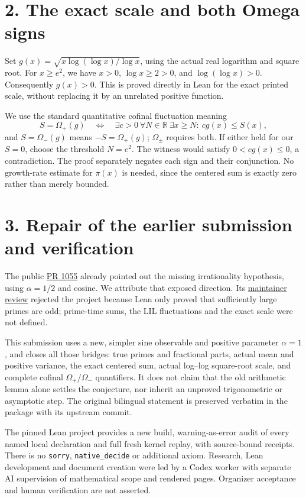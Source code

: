\documentclass[10pt]{article}
\begin{document}
\newpage
\section*{2. The exact scale and both Omega signs}
Set $g(x)=\sqrt{x\log(\log x)/\log x}$, using the actual real logarithm and square root. For $x\ge e^2$, we have $x>0$, $\log x\ge2>0$, and $\log(\log x)>0$. Consequently $g(x)>0$. This is proved directly in Lean for the exact printed scale, without replacing it by an unrelated positive function.

We use the standard quantitative cofinal fluctuation meaning
\[
 S=\Omega_+(g)\quad\Longleftrightarrow\quad
 \exists c>0\ \forall N\in\mathbb R\ \exists x\ge N:\ c g(x)\le S(x),
\]
and $S=\Omega_-(g)$ means $-S=\Omega_+(g)$; $\Omega_{\pm}$ requires both. If either held for our $S=0$, choose the threshold $N=e^2$. The witness would satisfy $0<c g(x)\le0$, a contradiction. The proof separately negates each sign and their conjunction. No growth-rate estimate for $\pi(x)$ is needed, since the centered sum is exactly zero rather than merely bounded.

\section*{3. Repair of the earlier submission and verification}
The public \href{https://github.com/The-Last-Math-Competition/The-Last-Math-Competition/pull/1055}{PR 1055} already pointed out the missing irrationality hypothesis, using $\alpha=1/2$ and cosine. We attribute that exposed direction. Its \href{https://github.com/The-Last-Math-Competition/The-Last-Math-Competition/pull/1055#issuecomment-6270091958}{maintainer review} rejected the project because Lean only proved that sufficiently large primes are odd; prime-time sums, the LIL fluctuations and the exact scale were not defined.

This submission uses a new, simpler sine observable and positive parameter $\alpha=1$, and closes all those bridges: true primes and fractional parts, actual mean and positive variance, the exact centered sum, actual log--log square-root scale, and complete cofinal $\Omega_+$/$\Omega_-$ quantifiers. It does not claim that the old arithmetic lemma alone settles the conjecture, nor inherit an unproved trigonometric or asymptotic step. The original bilingual statement is preserved verbatim in the package with its upstream commit.

The pinned Lean project provides a new build, warning-as-error audit of every named local declaration and full fresh kernel replay, with source-bound receipts. There is no \texttt{sorry}, \texttt{native\_decide} or additional axiom. Research, Lean development and document creation were led by a Codex worker with separate AI supervision of mathematical scope and rendered pages. Organizer acceptance and human verification are not asserted.
\end{document}
